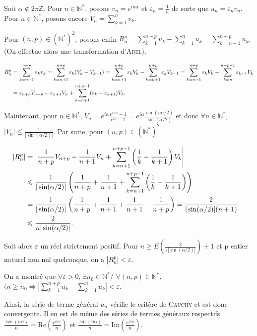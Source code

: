 \documentclass[11pt,a4paper]{article}
\newcommand{\Nn}{\mathbb{N}} \newcommand{\N}{\mathbb{N}}
\newcommand{\Zz}{\mathbb{Z}} \newcommand{\Z}{\mathbb{Z}}
\begin{document}
\begin{enumerate}
Soit $\alpha\notin2\pi\Zz$. Pour $n\in\Nn^*$, posons $v_n=e^{in\alpha}$ et $\varepsilon_n=\frac{1}{n}$ de sorte que $u_n=\varepsilon_nv_n$. Pour $n\in\Nn^*$, posons encore $V_n =\sum_{k=1}^{n}v_k$.

Pour $(n ,p)\in(\Nn^*)^2$, posons enfin $R_n^p=\sum_{k=1}^{n+p}u_k-\sum_{k=1}^{n}u_k=\sum_{k=n+1}^{n+p}u_k$. (On effectue alors une transformation d'\textsc{Abel}).

\begin{align*}\ensuremath
R_n^p&=\sum_{k=n+1}^{n+p}\varepsilon_kv_k =\sum_{k=n+1}^{n+p}\varepsilon_k(V_k-V_{k-1}) =\sum_{k=n+1}^{n+p}\varepsilon_kV_k-\sum_{k=n+1}^{n+p}\varepsilon_kV_{k-1} =\sum_{k=n+1}^{n+p}\varepsilon_kV_k-\sum_{k=n}^{n+p-1}\varepsilon_{k+1}V_{k}\\
 &=\varepsilon_{n+p}V_{n+p}-\varepsilon_{n+1}V_n+ \sum_{k=n+1}^{n+p-1}(\varepsilon_k-\varepsilon_{k+1})V_k.
\end{align*}

Maintenant, pour $n\in\Nn^*$, $V_n=e^{i\alpha}\frac{e^{in\alpha}-1}{e^{i\alpha}-1}=e^{i\alpha}\frac{\sin(n\alpha/2)}{\sin(\alpha/2)}$  et donc $\forall n\in\Nn^*$, $|V_n|\leqslant\frac{1}{|\sin(\alpha/2)|}$. Par suite, pour $(n,p)\in(\Nn^*)^2$

\begin{align*}\ensuremath
|R_n^p|&=\left|\frac{1}{n+p}V_{n+p}-\frac{1}{n+1}V_n+ \sum_{k=n+1}^{n+p-1}\left(\frac{1}{k}-\frac{1}{k+1}\right)V_k\right|&\\
 &\leqslant\frac{1}{|\sin(\alpha/2)|}\left(\frac{1}{n+p}+\frac{1}{n+1}+ \sum_{k=n+1}^{n+p-1}\left(\frac{1}{k}-\frac{1}{k+1}\right)\right)\\
 &=\frac{1}{|\sin(\alpha/2)|}\left(\frac{1}{n+p}+\frac{1}{n+1}+\frac{1}{n+1}-\frac{1}{n+p}\right)=\frac{2}{|\sin(\alpha/2)|(n+1)}\\
  &\leqslant\frac{2}{n|\sin(\alpha/2)|}.
\end{align*}

Soit alors $\varepsilon$ un réel strictement positif. Pour $n\geqslant E\left(\frac{2}{\varepsilon|\sin(\alpha/2)|}\right)+ 1$ et p entier naturel non nul quelconque, on a $|R_n^p|<\varepsilon$.

On a montré que $\forall\varepsilon>0$, $\exists n_0\in\Nn^*/$ $\forall(n,p)\in\Nn^*$, $(n\geqslant n_0\Rightarrow\left|\sum_{k=1}^{n+p}u_k-\sum_{k=1}^{n}u_k\right|<\varepsilon$.

Ainsi, la série de terme général $u_n$ vérifie le critère de \textsc{Cauchy} et est donc convergente.
Il en est de même des séries de termes généraux respectifs  $\frac{\cos(n\alpha)}{n}=\text{Re}\left(\frac{e^{in\alpha}}{n}\right)$ et $\frac{\sin(n\alpha)}{n}=\text{Im}\left(\frac{e^{in\alpha}}{n}\right)$.


\end{enumerate}
\end{document}

